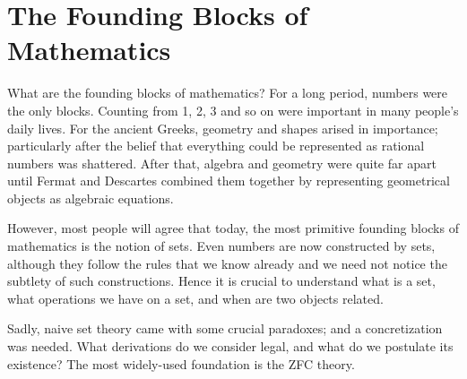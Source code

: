 \part[Blocks]{The Founding Blocks of Mathematics}

What are the founding blocks of mathematics?
For a long period, numbers were the only blocks.
Counting from 1, 2, 3 and so on were important
in many people's daily lives.
For the ancient Greeks,
geometry and shapes arised in importance;
particularly after
the belief that everything could be represented as rational numbers
was shattered.
After that, algebra and geometry were quite far apart
until Fermat and Descartes combined them together
by representing geometrical objects as algebraic equations.

However, most people will agree that
today, the most primitive founding blocks of mathematics
is the notion of sets.
Even numbers are now constructed by sets,
although they follow the rules that we know already
and we need not notice the subtlety of such constructions.
Hence it is crucial to understand
what is a set,
what operations we have on a set,
and when are two objects related.

Sadly, naive set theory came with some crucial paradoxes;
and a concretization was needed.
What derivations do we consider legal,
and what do we postulate its existence?
The most widely-used foundation is the ZFC theory.